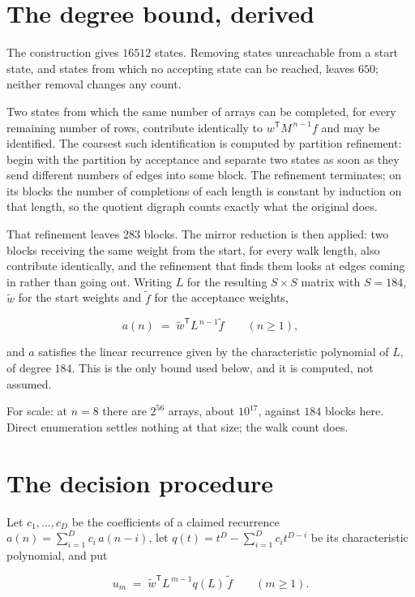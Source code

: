 \documentclass[11pt]{article}
\theoremstyle{definition}
\begin{document}
\section{The degree bound, derived}

The construction gives $16512$ states. Removing states unreachable from a start state, and states from which no accepting state can be reached, leaves $650$; neither removal changes any count.

Two states from which the same number of arrays can be completed, for every remaining number of rows, contribute identically to $w^{\mathsf T}M^{\,n-1}f$ and may be identified. The coarsest such identification is computed by partition refinement: begin with the partition by acceptance and separate two states as soon as they send different numbers of edges into some block. The refinement terminates; on its blocks the number of completions of each length is constant by induction on that length, so the quotient digraph counts exactly what the original does.

That refinement leaves $283$ blocks. The mirror reduction is then applied: two blocks receiving the same weight from the start, for every walk length, also contribute identically, and the refinement that finds them looks at edges coming in rather than going out. Writing $L$ for the resulting $S \times S$ matrix with $S = 184$, $\tilde w$ for the start weights and $\tilde f$ for the acceptance weights,

\[a(n) \;=\; \tilde w^{\mathsf T} L^{\,n-1} \tilde f \qquad (n \ge 1),\]

and $a$ satisfies the linear recurrence given by the characteristic polynomial of $L$, of degree $184$. This is the only bound used below, and it is computed, not assumed.

For scale: at $n = 8$ there are $2^{56}$ arrays, about $10^{17}$, against $184$ blocks here. Direct enumeration settles nothing at that size; the walk count does.

\section{The decision procedure}

Let $c_1,\dots,c_D$ be the coefficients of a claimed recurrence $a(n) = \sum_{i=1}^{D} c_i\,a(n-i)$, let $q(t) = t^{D} - \sum_{i=1}^{D} c_i t^{D-i}$ be its characteristic polynomial, and put

\[u_m \;=\; \tilde w^{\mathsf T} L^{\,m-1} q(L)\,\tilde f \qquad (m \ge 1).\]
\end{document}
